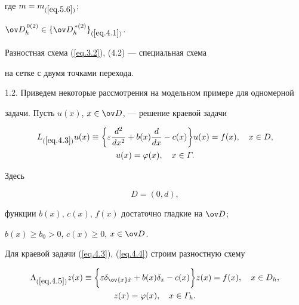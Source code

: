 где $m=m_{(\ref{eq.5.6})}$;


$\ov D_h^{\,0(2)}\in\{\ov D_h^{\,*(2)}\}_{(\ref{eq.4.1})}$.


\addtocounter{equation}{2}





Разностная схема (\ref{eq.3.2}), (4.2) --- специальная схема 


на сетке с двумя точками перехода.





1.2. Приведем некоторые рассмотрения на модельном примере для одномерной 


задачи. Пусть $u(x)$, $x\in \ov D$, --- решение краевой задачи


\begin{gather}\label{eq.4.3}


L_{(\ref{eq.4.3})}u(x) \equiv \bigg\{\varepsilon\frac{d^2}{d x^2}+


b(x)\frac{d}{dx}-c(x)\bigg\}u(x)=f(x), \quad x\in D, \\


u(x) = \varphi(x), \quad x\in \varGamma.\notag


\end{gather}


Здесь 


\begin{equation} \label{eq.4.4}


D=(0,d),


\end{equation}


функции $b(x)$, $c(x)$, $f(x)$ достаточно гладкие на $\ov D$;


$b(x)\ge b_0>0$, $c(x)\ge 0$, $x\in \ov D$.





Для краевой задачи (\ref{eq.4.3}), (\ref{eq.4.4}) строим разностную схему


\begin{gather} \label{eq.4.5}


\Lambda_{(\ref{eq.4.5})}z(x)\equiv\bigg\{\varepsilon\delta_{\ov{x}\Hat{x}}+


b(x)\delta_x-c(x)\bigg\}z(x)=f(x), \quad x\in D_h,\\


z(x) = \varphi(x), \quad x\in \varGamma_h.\notag


\end{gather}


